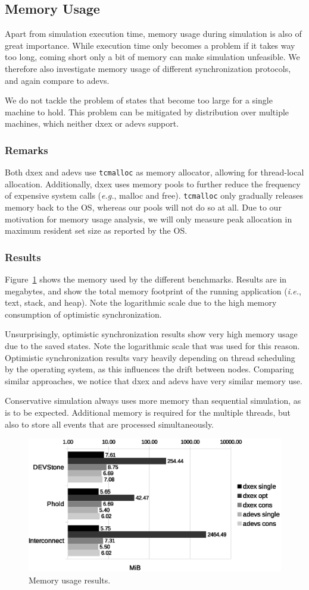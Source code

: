 \subsection{Memory Usage}
Apart from simulation execution time, memory usage during simulation is also of great importance.
While execution time only becomes a problem if it takes way too long, coming short only a bit of memory can make simulation unfeasible.
We therefore also investigate memory usage of different synchronization protocols, and again compare to adevs.

We do not tackle the problem of states that become too large for a single machine to hold.
This problem can be mitigated by distribution over multiple machines, which neither dxex or adevs support.

\subsubsection{Remarks}
Both dxex and adevs use \texttt{tcmalloc} as memory allocator, allowing for thread-local allocation.
Additionally, dxex uses memory pools to further reduce the frequency of expensive system calls (\textit{e.g.}, malloc and free).
\texttt{tcmalloc} only gradually releases memory back to the OS, whereas our pools will not do so at all.
Due to our motivation for memory usage analysis, we will only measure peak allocation in maximum resident set size as reported by the OS.

\subsubsection{Results}
Figure~\ref{fig:memory} shows the memory used by the different benchmarks.
Results are in megabytes, and show the total memory footprint of the running application (\textit{i.e.}, text, stack, and heap).
Note the logarithmic scale due to the high memory consumption of optimistic synchronization.

Unsurprisingly, optimistic synchronization results show very high memory usage due to the saved states.
Note the logarithmic scale that was used for this reason.
Optimistic synchronization results vary heavily depending on thread scheduling by the operating system, as this influences the drift between nodes.
Comparing similar approaches, we notice that dxex and adevs have very similar memory use.

Conservative simulation always uses more memory than sequential simulation, as is to be expected.
Additional memory is required for the multiple threads, but also to store all events that are processed simultaneously.

\begin{figure}
    \includegraphics[width=\columnwidth]{fig/memory_voorlopig.eps}
    \caption{Memory usage results.}
    \label{fig:memory}
\end{figure}
